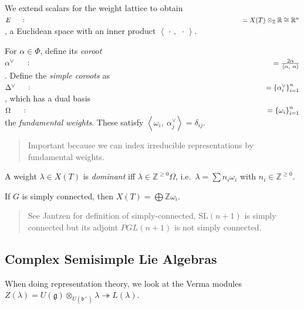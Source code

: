 \begin{definition}

\begin{definition}

We extend scalars for the weight lattice to obtain
\(E \mathrel{\vcenter{:}}= X(T) \otimes_{\mathbb{Z}}{\mathbb{R}}\cong {\mathbb{R}}^n\),
a Euclidean space with an inner product
\({\left\langle {{\,\cdot\,}},~{{\,\cdot\,}} \right\rangle}\).

For \(\alpha\in \Phi\), define its \emph{coroot}
\(\alpha^\vee\mathrel{\vcenter{:}}={2\alpha \over {\left\langle {\alpha},~{\alpha} \right\rangle}}\).
Define the \emph{simple coroots} as
\(\Delta^\vee\mathrel{\vcenter{:}}=\left\{{\alpha_i^\vee}\right\}_{i=1}^n\),
which has a dual basis
\(\Omega \mathrel{\vcenter{:}}=\left\{{\omega_i}\right\}_{i=1}^n\) the
\emph{fundamental weights}. These satisfy
\({\left\langle {\omega_i},~{\alpha_j^\vee} \right\rangle} = \delta_{ij}\).


\begin{quote}
Important because we can index irreducible representations by
fundamental weights.
\end{quote}

A weight \(\lambda\in X(T)\) is \emph{dominant} iff
\(\lambda \in {\mathbb{Z}}^{\geq 0} \Omega\),
i.e.~\(\lambda = \sum n_i \omega_i\) with
\(n_i \in {\mathbb{Z}}^{\geq 0}\).

\end{definition}

\end{definition}

If \(G\) is simply connected, then
\(X(T) = \bigoplus {\mathbb{Z}}\omega_i\).

\begin{quote}
See Jantzen for definition of simply-connected, \({\text{SL}}(n+1)\) is
simply connected but its adjoint \(PGL(n+1)\) is not simply connected.
\end{quote}

\hypertarget{complex-semisimple-lie-algebras}{%
\subsection{Complex Semisimple Lie
Algebras}\label{complex-semisimple-lie-algebras}}

When doing representation theory, we look at the Verma modules
\(Z(\lambda) = U({\mathfrak{g}}) \otimes_{U({\mathfrak{b}}^+)} \lambda \twoheadrightarrow L(\lambda)\).

